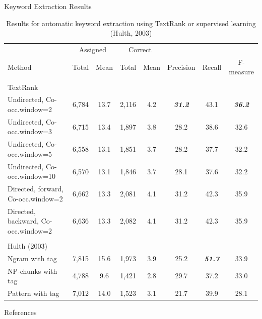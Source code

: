 \documentclass[10pt]{beamer}
\newcommand{\themename}{\textbf{\textsc{metropolis}}\xspace}
\begin{document}
\begin{frame}[fragile]{Keyword Extraction Results}
\begin{table}
\begin{center}
\tiny
\label{tab:hulth}
\caption{\tiny Results for automatic keyword extraction using TextRank or supervised learning (Hulth, 2003)}
\begin{tabular}{l c c c c c c c}
\toprule
& \multicolumn{2}{c}{Assigned} & \multicolumn{2}{c}{Correct}\\
\cline{2-5}
Method & Total & Mean & Total & Mean & Precision & Recall & F-measure\\
\midrule
\\
TextRank\\
\hline
Undirected, Co-occ.window=2 & 6,784 & 13.7 & 2,116 & 4.2 & \emph{\textbf{31.2}} & 43.1 & \emph{\textbf{36.2}}\\
Undirected, Co-occ.window=3 & 6,715 & 13.4 & 1,897 & 3.8 & 28.2 & 38.6 & 32.6\\
Undirected, Co-occ.window=5 & 6,558 & 13.1 & 1,851 & 3.7 & 28.2 & 37.7 & 32.2\\
Undirected, Co-occ.window=10 & 6,570 & 13.1 & 1,846 & 3.7 & 28.1 & 37.6 & 32.2\\
Directed, forward, Co-occ.window=2 & 6,662 & 13.3 & 2,081 & 4.1 & 31.2 & 42.3 & 35.9\\
Directed, backward, Co-occ.window=2 & 6,636 & 13.3 & 2,082 & 4.1 & 31.2 & 42.3 & 35.9\\
\\
Hulth (2003)\\
\hline
Ngram with tag & 7,815 & 15.6 & 1,973 & 3.9 & 25.2 & \emph{\textbf{51.7}} & 33.9\\
NP-chunks with tag & 4,788 & 9.6 & 1,421 & 2.8 & 29.7 & 37.2 & 33.0\\
Pattern with tag & 7,012 & 14.0 & 1,523 & 3.1 & 21.7 & 39.9 & 28.1\\
\bottomrule
\end{tabular}
\end{center}
\end{table}
\end{frame}
%
%

\begin{frame}[allowframebreaks]{References}

  
  

\end{frame}
\end{document}
